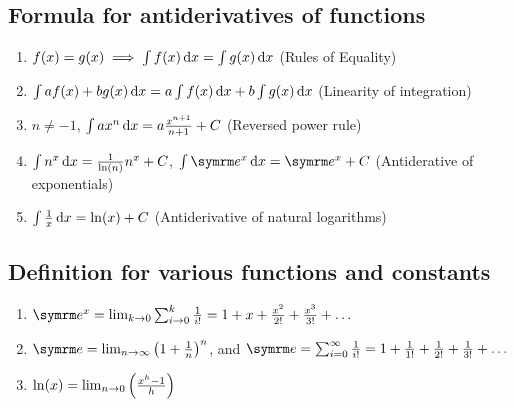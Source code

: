 \subsection{Formula for antiderivatives of functions}

\begin{enumerate}
    \item $f(x) = g(x) \implies \int f(x)\odif{x} = \int g(x)\odif{x}$ (Rules of Equality)
    \item $\int af(x) + bg(x) \odif{x} = a\int f(x)\odif{x} + b\int g(x)\odif{x}$ (Linearity of integration)
    \item $n \neq -1$, $\int ax^n\odif{x} = a\frac{x^{n + 1}}{n + 1} + C$ (Reversed power rule)
    \item $\int n^x\odif{x} = \frac{1}{\ln(n)}n^x + C$, $\int \e^x\odif{x} = \e^x + C$ (Antiderative of exponentials)
    \item $\int \frac{1}{x}\odif{x} = \ln(x) + C$ (Antiderivative of natural logarithms)
\end{enumerate}

\subsection{Definition for various functions and constants}

\begin{enumerate}
	\item $\e^x = \lim_{k \appr 0}\sum_{i \appr 0}^{k}\frac{1}{i!} = 1 + x + \frac{x^2}{2!} + \frac{x^3}{3!} + \dots$
	\item $\e = \lim_{n \appr \infty}\left(1 + \frac{1}{n}\right)^n$, and $\e = \sum_{i = 0}^{\infty}\frac{1}{i!} = 1 + \frac{1}{1!} + \frac{1}{2!} + \frac{1}{3!} + \dots$
    \item $\ln(x) = \lim_{n \rightarrow 0}\left(\frac{x^h - 1}{h}\right)$
\end{enumerate}

\everymath{\textstyle}
